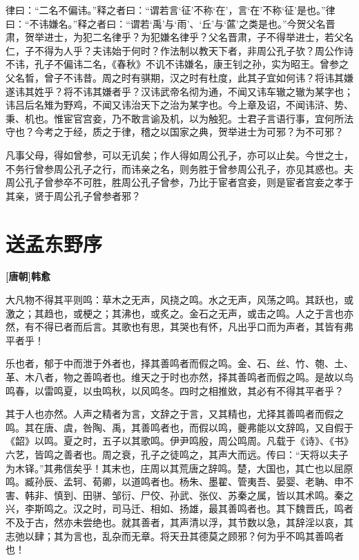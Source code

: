 \documentclass[UTF8,titlepage,oneside]{ctexbook}
\begin{document}
律曰：“二名不偏讳。”释之者曰：“谓若言‘征’不称‘在’，言‘在’不称‘征’是也。”律曰：“不讳嫌名。”释之者曰：“谓若‘禹’与‘雨’、‘丘’与‘蓲’之类是也。”今贺父名晋肃，贺举进士，为犯二名律乎？为犯嫌名律乎？父名晋肃，子不得举进士，若父名仁，子不得为人乎？夫讳始于何时？作法制以教天下者，非周公孔子欤？周公作诗不讳，孔子不偏讳二名，《春秋》不讥不讳嫌名，康王钊之孙，实为昭王。曾参之父名晳，曾子不讳昔。周之时有骐期，汉之时有杜度，此其子宜如何讳？将讳其嫌遂讳其姓乎？将不讳其嫌者乎？汉讳武帝名彻为通，不闻又讳车辙之辙为某字也；讳吕后名雉为野鸡，不闻又讳治天下之治为某字也。今上章及诏，不闻讳浒、势、秉、机也。惟宦官宫妾，乃不敢言谕及机，以为触犯。士君子言语行事，宜何所法守也？今考之于经，质之于律，稽之以国家之典，贺举进士为可邪？为不可邪？

凡事父母，得如曾参，可以无讥矣；作人得如周公孔子，亦可以止矣。今世之士，不务行曾参周公孔子之行，而讳亲之名，则务胜于曾参周公孔子，亦见其惑也。夫周公孔子曾参卒不可胜，胜周公孔子曾参，乃比于宦者宫妾，则是宦者宫妾之孝于其亲，贤于周公孔子曾参者邪？


\chapter*{送孟东野序}
\begin{center}
	\textbf{[唐朝]韩愈}
\end{center}

大凡物不得其平则鸣：草木之无声，风挠之鸣。水之无声，风荡之鸣。其跃也，或激之；其趋也，或梗之；其沸也，或炙之。金石之无声，或击之鸣。人之于言也亦然，有不得已者而后言。其歌也有思，其哭也有怀，凡出乎口而为声者，其皆有弗平者乎！

乐也者，郁于中而泄于外者也，择其善鸣者而假之鸣。金、石、丝、竹、匏、土、革、木八者，物之善鸣者也。维天之于时也亦然，择其善鸣者而假之鸣。是故以鸟鸣春，以雷鸣夏，以虫鸣秋，以风鸣冬。四时之相推敚，其必有不得其平者乎？

其于人也亦然。人声之精者为言，文辞之于言，又其精也，尤择其善鸣者而假之鸣。其在唐、虞，咎陶、禹，其善鸣者也，而假以鸣，夔弗能以文辞鸣，又自假于《韶》以鸣。夏之时，五子以其歌鸣。伊尹鸣殷，周公鸣周。凡载于《诗》、《书》六艺，皆鸣之善者也。周之衰，孔子之徒鸣之，其声大而远。传曰：“天将以夫子为木铎。”其弗信矣乎！其末也，庄周以其荒唐之辞鸣。楚，大国也，其亡也以屈原鸣。臧孙辰、孟轲、荀卿，以道鸣者也。杨朱、墨翟、管夷吾、晏婴、老聃、申不害、韩非、慎到、田骈、邹衍、尸佼、孙武、张仪、苏秦之属，皆以其术鸣。秦之兴，李斯鸣之。汉之时，司马迁、相如、扬雄，最其善鸣者也。其下魏晋氏，鸣者不及于古，然亦未尝绝也。就其善者，其声清以浮，其节数以急，其辞淫以哀，其志弛以肆；其为言也，乱杂而无章。将天丑其德莫之顾邪？何为乎不鸣其善鸣者也！
\end{document}
